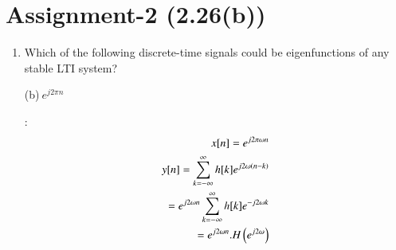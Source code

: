 \documentclass[journal,12pt,twocolumn]{IEEEtran}
\begin{document}
\section{Assignment-2 (2.26(b))}
\begin{enumerate}
	\item Which of the following discrete-time signals could be eigenfunctions of any stable LTI system?\\
	\begin{enumerate}
		(b)$\:e^{j2\pi n}$
	\end{enumerate}
	\solution:
	\begin{align}
		x[n]=e^{j2\pi\omega n}\\
		y[n]=\sum_{k=-\infty}^{\infty}h[k]e^{j2\omega\left(n-k\right)}\\
		=e^{j2\omega n}\sum_{k=-\infty}^{\infty}h[k]e^{-j2\omega k}\\
		=e^{j2\omega n}.H\left(e^{j2\omega}\right)
	\end{align}
\end{enumerate}
\end{document}
